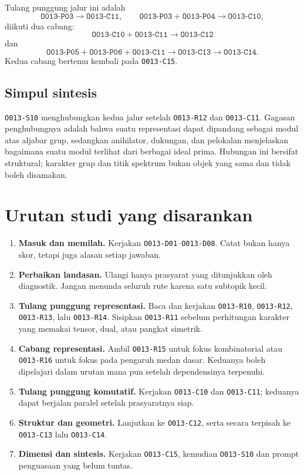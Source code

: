 \documentclass[11pt,a4paper]{article}
\newcommand{\oid}[1]{\texttt{#1}}
\begin{document}
Tulang punggung jalur ini adalah
\[
\oid{O013-P03}\longrightarrow\oid{O013-C11},\qquad
\oid{O013-P03}+\oid{O013-P04}\longrightarrow\oid{O013-C10},
\]
diikuti dua cabang:
\[
\oid{O013-C10}+\oid{O013-C11}\longrightarrow\oid{O013-C12}
\]
dan
\[
\oid{O013-P05}+\oid{O013-P06}+\oid{O013-C11}
\longrightarrow\oid{O013-C13}
\longrightarrow\oid{O013-C14}.
\]
Kedua cabang bertemu kembali pada \oid{O013-C15}.

\subsection*{Simpul sintesis}

\oid{O013-S10} menghubungkan kedua jalur setelah
\oid{O013-R12} dan \oid{O013-C11}. Gagasan penghubungnya adalah bahwa suatu
representasi dapat dipandang sebagai modul atas aljabar grup, sedangkan
anihilator, dukungan, dan pelokalan menjelaskan bagaimana suatu modul terlihat
dari berbagai ideal prima. Hubungan ini bersifat struktural; karakter grup dan
titik spektrum bukan objek yang sama dan tidak boleh disamakan.

\section{Urutan studi yang disarankan}

\begin{enumerate}[label=\textbf{Tahap \arabic*.}]
\item \textbf{Masuk dan memilah.} Kerjakan \oid{O013-D01}--\oid{O013-D08}.
Catat bukan hanya skor, tetapi juga alasan setiap jawaban.
\item \textbf{Perbaikan landasan.} Ulangi hanya prasyarat yang ditunjukkan
oleh diagnostik. Jangan menunda seluruh rute karena satu subtopik kecil.
\item \textbf{Tulang punggung representasi.} Baca dan kerjakan
\oid{O013-R10}, \oid{O013-R12}, \oid{O013-R13}, lalu
\oid{O013-R14}. Sisipkan \oid{O013-R11} sebelum perhitungan karakter yang
memakai tensor, dual, atau pangkat simetrik.
\item \textbf{Cabang representasi.} Ambil \oid{O013-R15} untuk fokus
kombinatorial atau \oid{O013-R16} untuk fokus pada pengaruh medan dasar.
Keduanya boleh dipelajari dalam urutan mana pun setelah dependensinya terpenuhi.
\item \textbf{Tulang punggung komutatif.} Kerjakan \oid{O013-C10} dan
\oid{O013-C11}; keduanya dapat berjalan paralel setelah prasyaratnya siap.
\item \textbf{Struktur dan geometri.} Lanjutkan ke \oid{O013-C12}, serta
secara terpisah ke \oid{O013-C13} lalu \oid{O013-C14}.
\item \textbf{Dimensi dan sintesis.} Kerjakan \oid{O013-C15}, kemudian
\oid{O013-S10} dan prompt penguasaan yang belum tuntas.
\end{enumerate}
\end{document}
